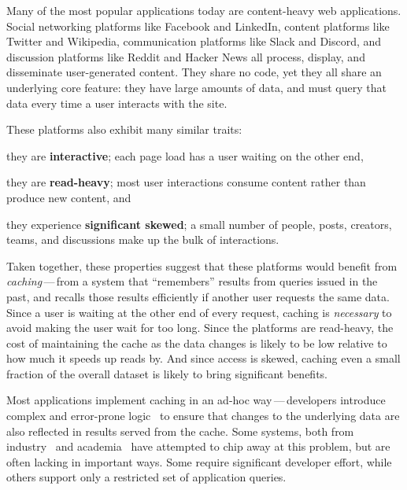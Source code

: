 Many of the most popular applications today are content-heavy web applications.
Social networking platforms like Facebook and LinkedIn, content platforms like
Twitter and Wikipedia, communication platforms like Slack and Discord, and
discussion platforms like Reddit and Hacker News all process, display, and
disseminate user-generated content. They share no code, yet they all share an
underlying core feature: they have large amounts of data, and must query that
data every time a user interacts with the site.

These platforms also exhibit many similar traits:
%
\begin{enumerate*}
  \item they are \textbf{interactive}; each page load has a user waiting on the
    other end,
  \item they are \textbf{read-heavy}; most user interactions consume content
    rather than produce new content, and
  \item they experience \textbf{significant skewed}; a small number of people,
    posts, creators, teams, and discussions make up the bulk of interactions.
\end{enumerate*}
%
Taken together, these properties suggest that these platforms would benefit
from \emph{caching}\,---\,from a system that ``remembers'' results from queries
issued in the past, and recalls those results efficiently if another user
requests the same data. Since a user is waiting at the other end of every
request, caching is \emph{necessary} to avoid making the user wait for too long.
Since the platforms are read-heavy, the cost of maintaining the cache as the
data changes is likely to be low relative to how much it speeds up reads by.
And since access is skewed, caching even a small fraction of the overall dataset
is likely to bring significant benefits.

Most applications implement caching in an ad-hoc way\,---\,developers introduce
complex and error-prone logic~\cite{ad-hoc-caching} to ensure that changes to
the underlying data are also reflected in results served from the cache. Some
systems, both from industry~\cite{facebook-memcache, tao, flannel} and
academia~\cite{txcache, cachegenie, casql-consistency-thesis, pequod} have
attempted to chip away at this problem, but are often lacking in important ways.
Some require significant developer effort, while others support only a
restricted set of application queries.

